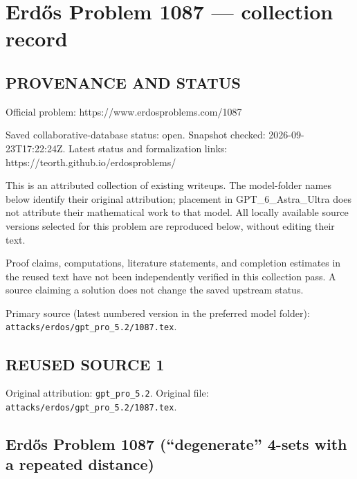 \section*{Erd\H{o}s Problem 1087 --- collection record}

\subsection*{PROVENANCE AND STATUS}
Official problem: https://www.erdosproblems.com/1087

Saved collaborative-database status: open.
Snapshot checked: 2026-09-23T17:22:24Z.
Latest status and formalization links: https://teorth.github.io/erdosproblems/

This is an attributed collection of existing writeups. The model-folder names below identify their original attribution; placement in GPT\_6\_Astra\_Ultra does not attribute their mathematical work to that model. All locally available source versions selected for this problem are reproduced below, without editing their text.

Proof claims, computations, literature statements, and completion estimates in the reused text have not been independently verified in this collection pass. A source claiming a solution does not change the saved upstream status.

Primary source (latest numbered version in the preferred model folder): \texttt{attacks/erdos/gpt\_pro\_5.2/1087.tex}.

\subsection*{REUSED SOURCE 1}
Original attribution: \texttt{gpt\_pro\_5.2}.
Original file: \texttt{attacks/erdos/gpt\_pro\_5.2/1087.tex}.


\subsection*{Erd\H{o}s Problem 1087 (``degenerate'' 4-sets with a repeated distance)}

